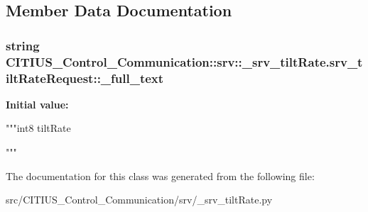 \subsection{\-Member \-Data \-Documentation}
\hypertarget{class_c_i_t_i_u_s___control___communication_1_1srv_1_1__srv__tilt_rate_1_1srv__tilt_rate_request_a3bd3203923b25cecff060f0240535fc6}{
\subsubsection[{\-\_\-full\-\_\-text}]{\setlength{\rightskip}{0pt plus 5cm}string \-C\-I\-T\-I\-U\-S\-\_\-\-Control\-\_\-\-Communication\-::srv\-::\-\_\-srv\-\_\-tilt\-Rate.\-srv\-\_\-tilt\-Rate\-Request\-::\-\_\-full\-\_\-text}}\label{class_c_i_t_i_u_s___control___communication_1_1srv_1_1__srv__tilt_rate_1_1srv__tilt_rate_request_a3bd3203923b25cecff060f0240535fc6}
{\bfseries \-Initial value\-:}
\begin{DoxyCode}
"""int8 tiltRate

"""
\end{DoxyCode}


\-The documentation for this class was generated from the following file\-:\begin{DoxyCompactItemize}
\item 
src/\-C\-I\-T\-I\-U\-S\-\_\-\-Control\-\_\-\-Communication/srv/\-\_\-srv\-\_\-tilt\-Rate.\-py\end{DoxyCompactItemize}
